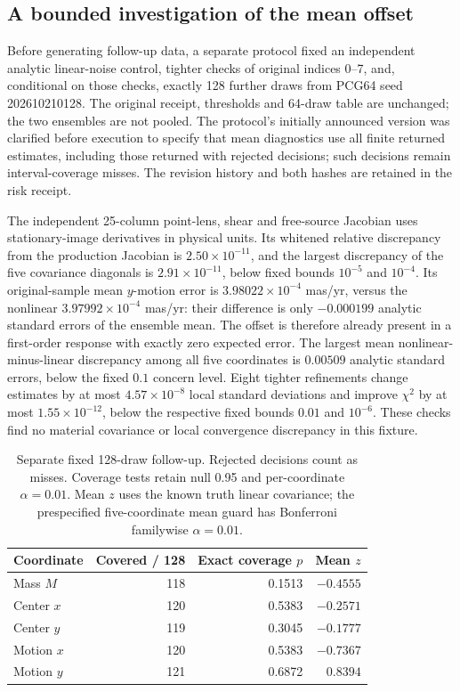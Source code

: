 \subsection{A bounded investigation of the mean offset}
Before generating follow-up data, a separate protocol fixed an independent
analytic linear-noise control, tighter checks of original indices 0--7,
and, conditional on those checks, exactly 128 further draws from PCG64
seed 202610210128. The original receipt, thresholds and 64-draw table are
unchanged; the two ensembles are not pooled. The protocol's initially
announced version was clarified before execution to specify that mean
diagnostics use all finite returned estimates, including those returned
with rejected decisions; such decisions remain interval-coverage misses.
The revision history and both hashes are retained in the risk receipt.

The independent 25-column point-lens, shear and free-source Jacobian uses
stationary-image derivatives in physical units. Its whitened relative
discrepancy from the production Jacobian is $2.50\times10^{-11}$, and the
largest discrepancy of the five covariance diagonals is
$2.91\times10^{-11}$, below fixed bounds $10^{-5}$ and $10^{-4}$.
Its original-sample mean $y$-motion error is
$3.98022\times10^{-4}$ mas/yr, versus the nonlinear
$3.97992\times10^{-4}$ mas/yr: their difference is only
$-0.000199$ analytic standard errors of the ensemble mean.
The offset is therefore already present in a first-order response with
exactly zero expected error. The largest mean nonlinear-minus-linear
discrepancy among all five coordinates is $0.00509$ analytic standard
errors, below the fixed $0.1$ concern level. Eight tighter refinements
change estimates by at most $4.57\times10^{-8}$ local standard deviations
and improve $\chi^2$ by at most $1.55\times10^{-12}$, below the respective
fixed bounds $0.01$ and $10^{-6}$. These checks find no material covariance
or local convergence discrepancy in this fixture.

\begin{table}[!b]
\centering\small
\caption{Separate fixed 128-draw follow-up. Rejected decisions count as
misses. Coverage tests retain null 0.95 and per-coordinate
$\alpha=0.01$. Mean $z$ uses the known truth linear covariance; the
prespecified five-coordinate mean guard has Bonferroni familywise
$\alpha=0.01$.}
\label{tab:product-risk-followup}
\begin{tabular}{@{}lrrr@{}}
\toprule
Coordinate & Covered / 128 & Exact coverage $p$ & Mean $z$\\
\midrule
Mass $M$ & 118 & 0.1513 & $-0.4555$\\
Center $x$ & 120 & 0.5383 & $-0.2571$\\
Center $y$ & 119 & 0.3045 & $-0.1777$\\
Motion $x$ & 120 & 0.5383 & $-0.7367$\\
Motion $y$ & 121 & 0.6872 & $0.8394$\\
\bottomrule
\end{tabular}
\end{table}

